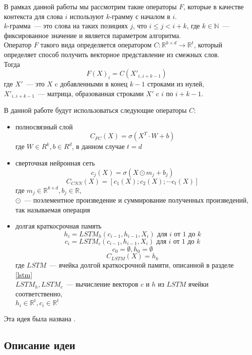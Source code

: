 В рамках данной работы мы рассмотрим такие операторы $F$, которые в качестве контекста
для слова $i$ используют $k$-грамму с началом в $i$.\\
$k$-грамма~--- это слова на таких позициях $j$, что $i \le j < i + k$, где $k \in \mathbb{N}$~--- фиксированное значение и является параметром алгоритма.\\
Оператор $F$ такого вида определяется оператором
$C:\mathbb{R}^{k \times d} \to \mathbb{R}^t$, который определяет способ 
получить векторное представление из смежных слов. \\
Тогда $$F(X)_i = C(X'_{i..i+k-1})$$
где $X'$~--- это $X$ c добавленными в конец $k-1$ строками из нулей, \\
$X'_{i..i+k-1}$~--- матрица, образованная строками $X'$ c $i$ по $i+k-1$.\par

\vspace{5mm}

\noindent В данной работе будут использоваться следующие операторы $C$:
\begin{itemize}
    \item{полносвязный слой}
        $$C_{FC}(X)=\sigma(X^T \cdot W + b)$$
        где $W \in R^k, b \in R^d$, в данном случае $t=d$
    \item{сверточная нейронная сеть}
        $$c_j(X)=\sigma(X \odot m_j + b_j)$$
        $$C_{CNN}(X)=[c_1(X); c_2(X); \cdots c_t(X)]$$
        где $m_j \in \mathbb{R}^{k \times d}, b_j \in \mathbb{R}$,\\
        $\odot$~--- поэлементное произведение и суммирование полученных произведений, 
        так называемая операция 
    \item{долгая краткосрочная память}
    $$h_i=LSTM_h(c_{i-1},h_{i-1}, X_i) \text{ для } i \text{ от } 1 \text { до } k$$  
    $$c_i=LSTM_c(c_{i-1}, h_{i-1}, X_i) \text{ для } i \text{ от } 1 \text { до } k$$ 
    $$c_0 = \emptyset, h_0 = \emptyset$$
    $$C_{LSTM}(X) = h_k$$
    где $LSTM$~--- ячейка долгой краткосрочной памяти, описанной в разделе \ref{lstm} \\
    $LSTM_h, LSTM_c$~--- вычисление векторов $c$ и $h$ из $LSTM$ ячейки соответственно,\\
    $h_i \in \mathbb{R}^t, c_i \in \mathbb{R}^t$
\end{itemize}

\noindent Эта идея была названа .

\subsection{Описание идеи } \label{mean_subtree}

